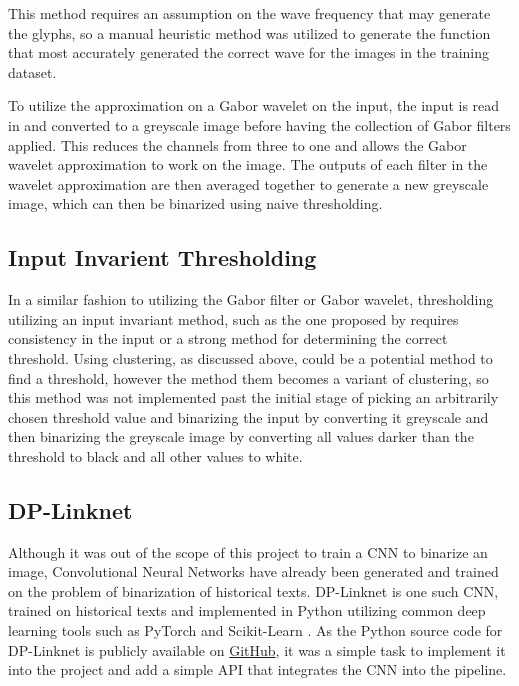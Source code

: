 This method requires an assumption on the wave frequency that may generate the glyphs, so a manual heuristic method was utilized to generate the function that most accurately generated the correct wave for the images in the training dataset.

To utilize the approximation on a Gabor wavelet on the input, the input is read in and converted to a greyscale image before having the collection of Gabor filters applied. This reduces the channels from three to one and allows the Gabor wavelet approximation to work on the image. The outputs of each filter in the wavelet approximation are then averaged together to generate a new greyscale image, which can then be binarized using naive thresholding.

\subsection{Input Invarient Thresholding}

In a similar fashion to utilizing the Gabor filter or Gabor wavelet, thresholding utilizing an input invariant method, such as the one proposed by \cite{Bar-Yosef2005, Bar-Yosef2007} requires consistency in the input or a strong method for determining the correct threshold. Using clustering, as discussed above, could be a potential method to find a threshold, however the method them becomes a variant of clustering, so this method was not implemented past the initial stage of picking an arbitrarily chosen threshold value and binarizing the input by converting it greyscale and then binarizing the greyscale image by converting all values darker than the threshold to black and all other values to white.

\subsection{DP-Linknet}

Although it was out of the scope of this project to train a CNN to binarize an image, Convolutional Neural Networks have already been generated and trained on the problem of binarization of historical texts. DP-Linknet \cite{Xiong} is one such CNN, trained on historical texts and implemented in Python utilizing common deep learning tools such as PyTorch \cite{PyTorch} and Scikit-Learn \cite{Scikit}. As the Python source code for DP-Linknet is publicly available on \href{https://github.com/beargolden/DP-LinkNet}{GitHub}, it was a simple task to implement it into the project and add a simple API that integrates the CNN into the pipeline.

